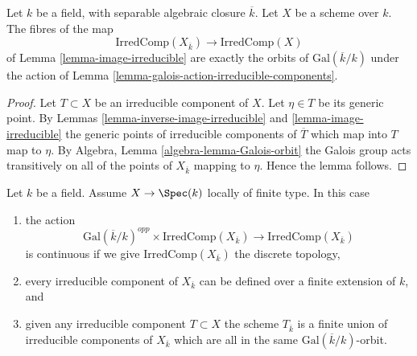 \begin{lemma}
\label{lemma-orbit-irreducible-components}
Let $k$ be a field, with separable algebraic closure $\overline{k}$.
Let $X$ be a scheme over $k$.
The fibres of the map
$$
\text{IrredComp}(X_{\overline{k}})
\longrightarrow
\text{IrredComp}(X)
$$
of
Lemma \ref{lemma-image-irreducible}
are exactly the orbits of $\text{Gal}(\overline{k}/k)$ under the action of
Lemma \ref{lemma-galois-action-irreducible-components}.
\end{lemma}

\begin{proof}
Let $T \subset X$ be an irreducible component of $X$.
Let $\eta \in T$ be its generic point. By
Lemmas \ref{lemma-inverse-image-irreducible} and
\ref{lemma-image-irreducible}
the generic points of irreducible components of $\overline{T}$
which map into $T$ map to $\eta$. By
Algebra, Lemma \ref{algebra-lemma-Galois-orbit}
the Galois group acts transitively on
all of the points of $X_{\overline{k}}$ mapping to $\eta$.
Hence the lemma follows.
\end{proof}

\begin{lemma}
\label{lemma-galois-action-irreducible-components-locally-finite-type}
Let $k$ be a field.
Assume $X \to \Spec(k)$ locally of finite type.
In this case
\begin{enumerate}
\item the action
$$
\text{Gal}(\overline{k}/k)^{opp} \times \text{IrredComp}(X_{\overline{k}})
\longrightarrow
\text{IrredComp}(X_{\overline{k}})
$$
is continuous if we give $\text{IrredComp}(X_{\overline{k}})$ the discrete
topology,
\item every irreducible component of $X_{\overline{k}}$
can be defined over a finite extension of $k$, and
\item given any irreducible component $T \subset X$ the scheme
$T_{\overline{k}}$ is a finite union of irreducible components of
$X_{\overline{k}}$ which are all in the same
$\text{Gal}(\overline{k}/k)$-orbit.
\end{enumerate}
\end{lemma}

